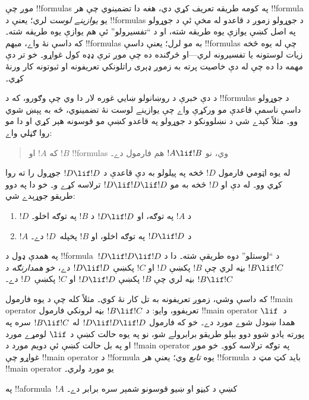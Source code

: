 \documentclass[../../../include/open-logic-section]{subfiles}
\begin{document}


\begin{explain}
موږ چې !!{formula}s په کومه طريقه تعريف کړي دي، هغه دا تضمينوي چې هر
!!{formula} يو \emph{يوازينے لوست} لري؛ يعنې د !!{formula}s د جوړولو
زموږ د قاعدو له مخې ئې د جوړولو په اصل کښې يوازې يوه طريقه شته، او د
``تفسيرولو'' ئې هم يوازې يوه طريقه شته۔ که داسې نۀ واے، مبهم
!!{formula}s به مو لرل؛ يعنې داسې !!{formula}s چې له يوه څخه زيات
لوستونه يا تفسيرونه لري---او څرګنده ده چې موږ ترې ډډه کول غواړو۔ خو
تر دې مهمه دا ده چې له دې خاصيت پرته به زموږ ډېری راتلونکي تعريفونه
او ثبوتونه کار ورنۀ کړي۔

د دې خبرې د روښانولو ښايي غوره لار دا وي چې وګورو، که د !!{formula}s
د جوړولو داسې ناسمې قاعدې مو ورکړې واے چې يوازينے لوست نۀ تضمينوي،
څه به پېښ شوي وو۔ مثلاً کېدے شي د نښلوونکو د جوړولو په قاعدو کښې مو
قوسونه هېر کړي او دا مو روا ګڼلي واے:
\begin{quote}
که $!A$ او $!B$ !!{formula}s وي، نو $!A \lif !B$ هم فارمول دے۔
\end{quote}
له يوه اټومي فارمول $!D$ څخه په پيلولو به دې قاعدې د $!D \lif !D$
جوړول را ته روا کړي وو۔ له دې او $!D$ څخه به مو $!D \lif !D \lif
!D$ ترلاسه کړے و۔ خو دا په دوو طريقو جوړېدے شي:
\begin{enumerate}
\item $!D$ د $!A$ په توګه، او $!D \lif !D$ د $!B$ په توګه اخلو۔
\item $!A$ د $!D \lif !D$ په توګه اخلو، او $!B$ پخپله~$!D$ دے۔
\end{enumerate}
په همدې ډول د !!{formula}~$!D \lif !D \lif !D$ د ``لوستلو'' دوه
طريقې شته۔ دا د $!B \lif !C$ بڼه لري چې $!B$ پکښې $!D$ او $!C$
پکښې $!D \lif !D$ دے، خو \emph{همدارنګه} د $!B \lif !C$ بڼه لري
چې $!B$ پکښې $!D \lif !D$ او $!C$ پکښې~$!D$ دے۔

که داسې وشي، زموږ تعريفونه به تل کار نۀ کوي۔ مثلاً کله چې د يوه فارمول
!!{main operator} تعريفوو، وايو: د $!B \lif !C$ بڼه لرونکي فارمول
!!{main operator} د~$\lif$ همدا ښودل شوے مورد دے۔ خو که فارمول $!D
\lif !D \lif !D$ له $!B \lif !C$ سره په پورته يادو شوو دوو بېلو
طريقو برابرولے شو، نو په يوه حالت کښې د $\lif$ لومړے مورد او په بل
حالت کښې ئې دويم مورد د !!{main operator} په توګه ترلاسه کوو۔ خو موږ
غواړو چې !!{main operator} د !!{formula} يوه \emph{تابع} وي؛ يعنې هر
!!{formula} بايد کټ مټ د !!{main
  operator} يو مورد ولري۔
\end{explain}

\begin{lem}
په !!a{formula}~$!A$ کښې د کيڼو او ښيو قوسونو شمېر سره برابر دے۔
\end{lem}
\end{document}
